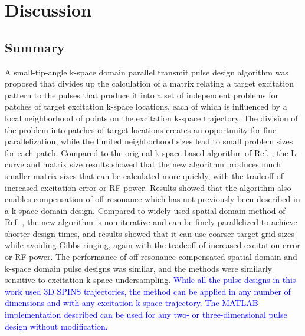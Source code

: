 \section*{Discussion}
\subsection*{Summary}
A small-tip-angle k-space domain parallel transmit pulse design algorithm was proposed
that divides up the calculation of a matrix relating a target excitation pattern to the pulses that produce it 
into a set of independent problems for patches of target excitation k-space locations,
each of which is influenced by a local neighborhood of points on the excitation k-space trajectory.
The division of the problem into patches of target locations creates an opportunity for fine parallelization,
while the limited neighborhood sizes lead to small problem sizes for each patch. 
Compared to the original k-space-based algorithm of Ref. \cite{Katscher:2003:Magn-Reson-Med:12509830},
the L-curve and matrix size results showed that 
the new algorithm produces much smaller matrix sizes that can be calculated more quickly,
with the tradeoff of increased excitation error or RF power. 
Results showed that the algorithm also enables compensation of off-resonance 
which has not previously been described in a k-space domain design. 
Compared to widely-used spatial domain method of Ref. \cite{Grissom:2006:MRM},
the new algorithm is non-iterative and can be finely parallelized to achieve shorter design times, 
and results showed that it can use coarser target grid sizes while avoiding Gibbs ringing, 
again with the tradeoff of increased excitation error or RF power.
The performance of off-resonance-compensated spatial domain and k-space domain pulse designs was similar,
and the methods were similarly sensitive to excitation k-space undersampling. 
\textcolor{blue}{While all the pulse designs in this work used 3D SPINS trajectories,
the method can be applied in any number of dimensions and with any excitation k-space trajectory.
The MATLAB implementation described can be used for any two- or three-dimensional pulse design without modification.}

